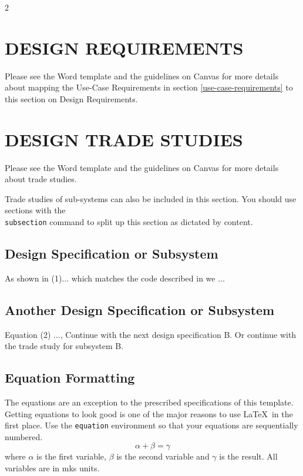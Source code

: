 \documentclass[10pt]{article}
\begin{document}
\begin{multicols*}{2}
\section{DESIGN REQUIREMENTS} \label{design-requirements}
Please see the Word template and the guidelines on Canvas for more details about mapping the Use-Case Requirements in section \ref{use-case-requirements} to this section on Design Requirements.

\section{DESIGN TRADE STUDIES} \label{design-trade-studies}
Please see the Word template and the guidelines on Canvas for more details about trade studies.

Trade studies of sub-systems can also be included in this section. You should use 
sections with the \texttt{\\subsection} command to split up this section as dictated
by content.

\subsection{Design Specification or Subsystem}
As shown in (1)$\ldots$  which matches the code described in \cite{NACE} we $\ldots$ 


\subsection{Another Design Specification or Subsystem}
Equation (2) $\ldots$, Continue with the next design specification B. Or continue with the trade study for subsystem B.

\subsection{Equation Formatting} \label{equation-formatting}
The equations are an exception to the prescribed specifications of this template. 
Getting equations to look good is one of the major reasons to use \LaTeX~in the first
place.  Use the \texttt{equation} environment so that your equations are
sequentially numbered.
\begin{equation}
    \alpha + \beta = \gamma \label{eq:alpha}
\end{equation}
where $\alpha$ is the first variable, $\beta$ is the second variable and $\gamma$ is the result. All variables are in mks units.


\end{multicols*}
\end{document}
